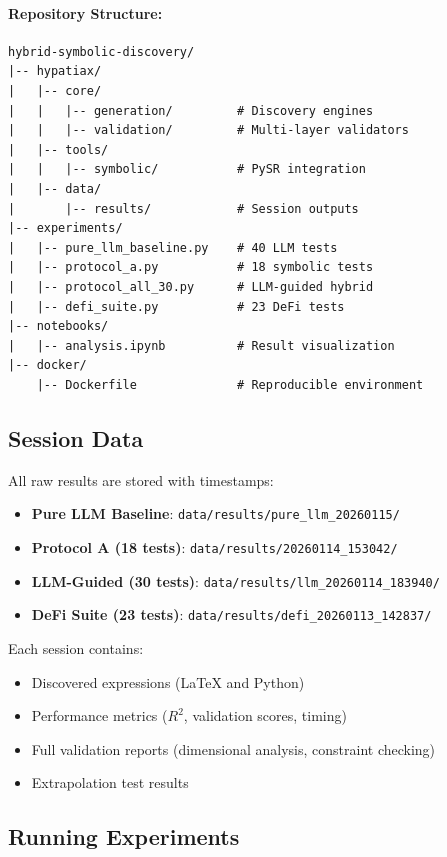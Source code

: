 \documentclass[twoside,11pt]{article}
\begin{document}
\paragraph{Repository Structure:}
\begin{small}
\begin{verbatim}
hybrid-symbolic-discovery/
|-- hypatiax/
|   |-- core/
|   |   |-- generation/         # Discovery engines
|   |   |-- validation/         # Multi-layer validators
|   |-- tools/
|   |   |-- symbolic/           # PySR integration
|   |-- data/
|       |-- results/            # Session outputs
|-- experiments/
|   |-- pure_llm_baseline.py    # 40 LLM tests
|   |-- protocol_a.py           # 18 symbolic tests
|   |-- protocol_all_30.py      # LLM-guided hybrid
|   |-- defi_suite.py           # 23 DeFi tests
|-- notebooks/
|   |-- analysis.ipynb          # Result visualization
|-- docker/
    |-- Dockerfile              # Reproducible environment
\end{verbatim}
\end{small}

\subsection{Session Data}

All raw results are stored with timestamps:

\begin{itemize}
\item \textbf{Pure LLM Baseline}: \texttt{data/results/pure\_llm\_20260115/}
\item \textbf{Protocol A (18 tests)}: \texttt{data/results/20260114\_153042/}
\item \textbf{LLM-Guided (30 tests)}: \texttt{data/results/llm\_20260114\_183940/}
\item \textbf{DeFi Suite (23 tests)}: \texttt{data/results/defi\_20260113\_142837/}
\end{itemize}

Each session contains:
\begin{itemize}
\item Discovered expressions (LaTeX and Python)
\item Performance metrics ($R^2$, validation scores, timing)
\item Full validation reports (dimensional analysis, constraint checking)
\item Extrapolation test results
\end{itemize}

\subsection{Running Experiments}
\end{document}
